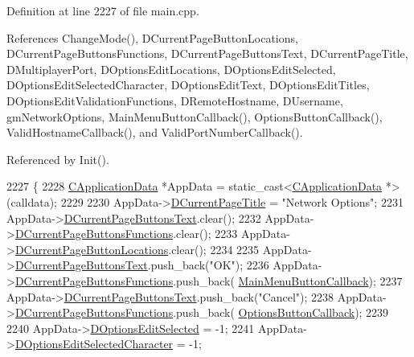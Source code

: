Definition at line 2227 of file main.\+cpp.



References Change\+Mode(), D\+Current\+Page\+Button\+Locations, D\+Current\+Page\+Buttons\+Functions, D\+Current\+Page\+Buttons\+Text, D\+Current\+Page\+Title, D\+Multiplayer\+Port, D\+Options\+Edit\+Locations, D\+Options\+Edit\+Selected, D\+Options\+Edit\+Selected\+Character, D\+Options\+Edit\+Text, D\+Options\+Edit\+Titles, D\+Options\+Edit\+Validation\+Functions, D\+Remote\+Hostname, D\+Username, gm\+Network\+Options, Main\+Menu\+Button\+Callback(), Options\+Button\+Callback(), Valid\+Hostname\+Callback(), and Valid\+Port\+Number\+Callback().



Referenced by Init().


\begin{DoxyCode}
2227                                                                  \{
2228     \hyperlink{classCApplicationData}{CApplicationData} *AppData = \textcolor{keyword}{static\_cast<}\hyperlink{classCApplicationData}{CApplicationData} *\textcolor{keyword}{>}(calldata);
2229 
2230     AppData->\hyperlink{classCApplicationData_a49ce7f0b5891f0f2c29b73aad636b761}{DCurrentPageTitle} = \textcolor{stringliteral}{"Network Options"};
2231     AppData->\hyperlink{classCApplicationData_af04b7f5f8ba4e5c99c0a3530055fc15d}{DCurrentPageButtonsText}.clear();
2232     AppData->\hyperlink{classCApplicationData_ad3079e5563a19d21c1e4ceff2a188382}{DCurrentPageButtonsFunctions}.clear();
2233     AppData->\hyperlink{classCApplicationData_a3615df8e23cea3ce17f11cf61340a7b4}{DCurrentPageButtonLocations}.clear();
2234     
2235     AppData->\hyperlink{classCApplicationData_af04b7f5f8ba4e5c99c0a3530055fc15d}{DCurrentPageButtonsText}.push\_back(\textcolor{stringliteral}{"OK"});
2236     AppData->\hyperlink{classCApplicationData_ad3079e5563a19d21c1e4ceff2a188382}{DCurrentPageButtonsFunctions}.push\_back(
      \hyperlink{classCApplicationData_a4410839118b5b74dab798ad7be6f703b}{MainMenuButtonCallback});
2237     AppData->\hyperlink{classCApplicationData_af04b7f5f8ba4e5c99c0a3530055fc15d}{DCurrentPageButtonsText}.push\_back(\textcolor{stringliteral}{"Cancel"});
2238     AppData->\hyperlink{classCApplicationData_ad3079e5563a19d21c1e4ceff2a188382}{DCurrentPageButtonsFunctions}.push\_back(
      \hyperlink{classCApplicationData_a3647cf78eb59689b901d4204c81555b4}{OptionsButtonCallback});
2239     
2240     AppData->\hyperlink{classCApplicationData_aee4aa5eb5b89b86eb2648d0f9c7358f9}{DOptionsEditSelected} = -1;
2241     AppData->\hyperlink{classCApplicationData_a921d69021fc61e51d12d8a26a5ac1a89}{DOptionsEditSelectedCharacter} = -1;

\end{DoxyCode}
